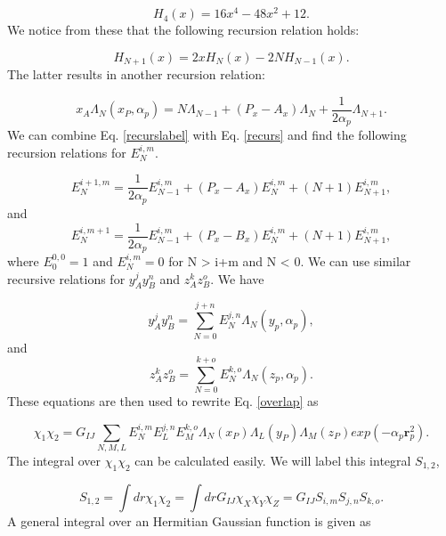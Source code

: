 \documentclass[a4paper,norsk,11pt,twoside]{report}
\begin{document}
\begin{equation}
H_4(x) = 16x^4 - 48x^2 + 12 . 
\end{equation}
We notice from these that the following recursion relation holds:

\begin{equation}
H_{N+1}(x)  = 2x H_N(x) - 2N H_{N-1}(x) .
\end{equation}
The latter results in another recursion relation:

\begin{equation}
x_A \Lambda_N(x_P,\alpha_p) = N\Lambda_{N-1} + (P_x - A_x) \Lambda_N + \frac{1}{2\alpha_p} \Lambda_{N+1} . \label{recurs}
\end{equation}
We can combine Eq. \eqref{recurslabel} with Eq. \eqref{recurs} and find the following recursion relations for $E_N^{i,m}$.

\begin{equation}
E_N^{i+1, m} = \frac{1}{2\alpha_p} E_{N-1}^{i,m} + (P_x - A_x) E_N^{i,m} + (N + 1) E_{N+1}^{i,m} ,
\end{equation}
and
\begin{equation}
E_N^{i, m+1} = \frac{1}{2\alpha_p} E_{N-1}^{i,m} + (P_x - B_x) E_N^{i,m} + (N + 1) E_{N+1}^{i,m} ,
\end{equation}
where $E_0^{0,0} = 1$ and $E_N^{i,m} = 0$ for N > i+m and N < 0. We can use similar recursive relations for $y_A^j y_B^n$ and $z_A^k z_B^o$. We have 

\begin{equation}
y_A^j y_B^n = \sum_{N=0}^{j+n} E_{N}^{j,n} \Lambda_N(y_p, \alpha_p) ,
\end{equation}
and
\begin{equation}
z_A^k z_B^o = \sum_{N=0}^{k+o} E_{N}^{k,o} \Lambda_N(z_p, \alpha_p) .
\end{equation}
These equations are then used to rewrite Eq. \eqref{overlap} as

\begin{equation}
\chi_1 \chi_2 = G_{IJ} \sum_{N,M,L} E_N^{i,m} E_L^{j,n} E_M^{k,o} \Lambda_N(x_P) \Lambda_L(y_P) \Lambda_M(z_P) exp(-\alpha_p \textbf{r}_p^2) .
\label{referequequequ}
\end{equation}
The integral over $\chi_1 \chi_2$ can be calculated easily. We will label this integral $S_{1,2}$,

\begin{equation}
S_{1,2} = \int dr \chi_1 \chi_2 = \int dr G_{IJ} \chi_X \chi_Y \chi_Z  = G_{IJ} S_{i,m} S_{j,n} S_{k,o}  . \label{Overlap_EquEqu}
\end{equation}
A general integral over an Hermitian Gaussian function is given as
\end{document}
